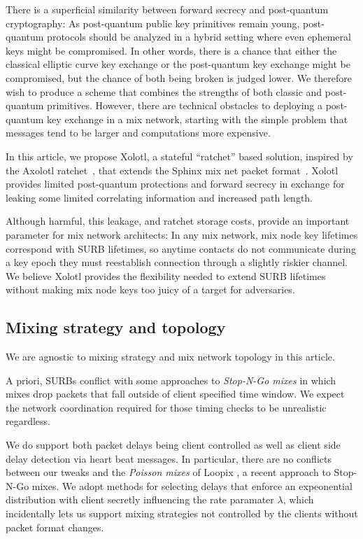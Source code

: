 There is a superficial similarity between forward secrecy and
post-quantum cryptography: As post-quantum public key primitives
remain young, post-quantum protocols should be analyzed in a hybrid
setting where even ephemeral keys might be compromised.  In other
words, there is a chance that either the classical elliptic curve key
exchange or the post-quantum key exchange might be compromised, but
the chance of both being broken is judged lower.  We therefore wish
to produce a scheme that combines the strengths of both classic and
post-quantum primitives.  However, there are technical obstacles to
deploying a post-quantum key exchange in a mix network, starting with
the simple problem that messages tend to be larger
and computations more expensive.

In this article, we propose Xolotl, a stateful ``ratchet'' based
solution, inspired by the Axolotl ratchet~\cite{TextSecure}, that
extends the Sphinx mix net packet format~\cite{Sphinx}.  
Xolotl provides limited post-quantum protections and forward secrecy
in exchange for leaking some limited correlating information and
increased path length.  

Although harmful, this leakage, and ratchet storage costs, provide an
important parameter for mix network architects:  In any mix network,
mix node key lifetimes correspond with SURB lifetimes, so anytime
contacts do not communicate during a key epoch they must reestablish
connection through a slightly riskier channel.  We believe Xolotl
provides the flexibility needed to extend SURB lifetimes without
making mix node keys too juicy of a target for adversaries.

\subsection{Mixing strategy and topology}

We are agnostic to mixing strategy and mix network topology in this
article. 

A priori, SURBs conflict with some approaches to {\em Stop-N-Go mixes}
\cite{StopNGo} in which mixes drop packets that fall outside of client
specified time window.  We expect the network coordination required
for those timing checks to be unrealistic regardless. 

We do support both packet delays being client controlled as well as
client side delay detection via heart beat messages.  In particular,
there are no conflicts between our tweaks and the {\em Poisson mixes}
of Loopix \cite{Loopix}, a recent approach to Stop-N-Go mixes.
We adopt methods for selecting delays that enforce an expeonential
distribution with client secretly influencing the rate paramater
$\lambda$, which incidentally lets us support mixing strategies not
controlled by the clients without packet format changes.

